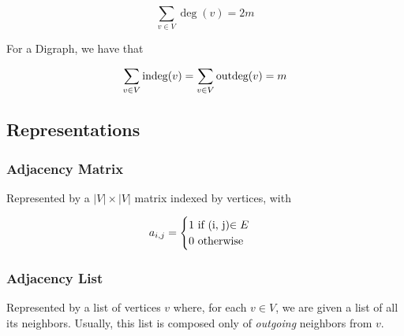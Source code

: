 \documentclass[12pt]{article}
\begin{document}
  \[
    \sum_{v \in V} \deg(v) = 2m
  \]


  For a Digraph, we have that

  \[
    \sum_{v \in V} \text{indeg}(v) = \sum_{v \in V} \text{outdeg}(v) = m
  \]





  \subsection{Representations}

  \subsubsection{Adjacency Matrix}

  Represented by a $|V| \times |V|$ matrix indexed by vertices, with

  \[
    a_{i,j} = \begin{cases}
      1 \text{ if } $(i, j)$ \in E \\
      0 \text{ otherwise}
    \end{cases}
  \]




  \subsubsection{Adjacency List}

  Represented by a list of vertices $v$ where, for each $v \in V$, we are given a
  list of all its neighbors. Usually, this list is composed only of {\it outgoing}
  neighbors from $v$.

\end{document}
